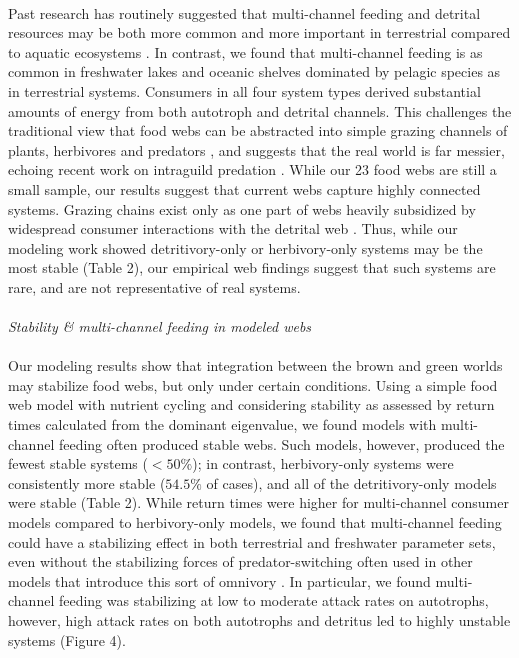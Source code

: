 \documentclass[12pt,a4paper,oneside]{article}
\begin{document}
\\
\indent 
Past research has routinely suggested that multi-channel feeding and detrital
resources may be both more common and more important in
terrestrial compared to aquatic ecosystems \citep{Polis:1996}.  In
contrast, we found that multi-channel feeding is as common in
freshwater lakes and oceanic shelves dominated by pelagic species as
in terrestrial systems. Consumers in all four system types derived substantial amounts of energy from both autotroph
and detrital channels. This challenges the traditional view that food
webs can be abstracted into simple grazing channels of plants,
herbivores and predators \citep{Holt:2006,  Pimm:1982}, and
suggests that the real world is far messier, echoing recent work on 
intraguild predation \citep{Rudolf:2007,miller2011}. While
our 23 food webs are still a small sample, our results
suggest that current webs capture highly connected systems. Grazing
chains exist only as one part of webs heavily subsidized by widespread
consumer interactions with the detrital web \citep{Moore:2004}. Thus, while our modeling work showed detritivory-only or herbivory-only systems may be the most stable (Table 2), our empirical web findings suggest that such systems are rare, and are not representative of real systems.
\\
\\
\noindent \emph{Stability \& multi-channel feeding in modeled webs}\\
\\
\indent Our modeling results show that integration between the brown and
green worlds may stabilize food webs, but only under certain conditions. 
Using a simple food web model with nutrient cycling and considering stability as assessed by return times calculated from the
dominant eigenvalue, we found models with multi-channel feeding often produced
stable webs. Such models, however, produced the fewest stable systems (\(<50\%\)); in contrast, herbivory-only systems were consistently more stable (\(54.5\%\) of cases), and all of the detritivory-only models were stable (Table 2). While return times were higher for multi-channel consumer models compared to herbivory-only models, we found that multi-channel feeding could have a stabilizing effect in both terrestrial and freshwater parameter sets, even without the stabilizing forces of
predator-switching often used in other models that introduce this sort of omnivory
\citep{Rooney:2006}. In particular, we found multi-channel feeding was stabilizing at low to moderate attack rates on autotrophs, however, high attack rates on both autotrophs and detritus led to highly unstable systems (Figure 4).
\end{document}
